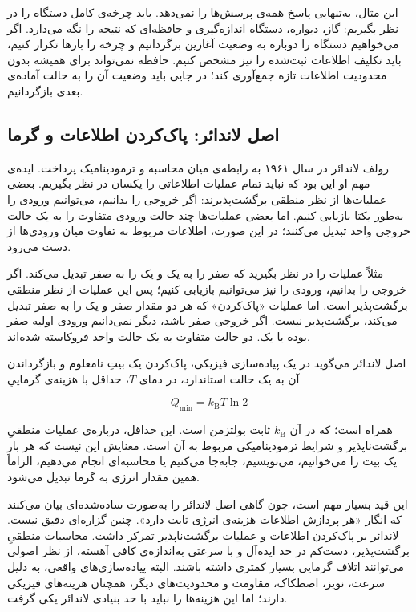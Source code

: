 این مثال، به‌تنهایی پاسخ همه‌ی پرسش‌ها را نمی‌دهد. باید چرخه‌ی کامل دستگاه را در نظر بگیریم: گاز، دیواره، دستگاه اندازه‌گیری و حافظه‌ای که نتیجه را نگه می‌دارد. اگر می‌خواهیم دستگاه را دوباره به وضعیت آغازین برگردانیم و چرخه را بارها تکرار کنیم، باید تکلیف اطلاعات ثبت‌شده را نیز مشخص کنیم. حافظه نمی‌تواند برای همیشه بدون محدودیت اطلاعات تازه جمع‌آوری کند؛ در جایی باید وضعیت آن را به حالت آماده‌ی بعدی بازگردانیم.

\subsection{اصل لاندائر: پاک‌کردن اطلاعات و گرما}
\label{sub:landauer-principle}

رولف لاندائر در سال ۱۹۶۱ به رابطه‌ی میان محاسبه و ترمودینامیک پرداخت. ایده‌ی مهم او این بود که نباید تمام عملیات اطلاعاتی را یکسان در نظر بگیریم. بعضی عملیات‌ها از نظر منطقی برگشت‌پذیرند: اگر خروجی را بدانیم، می‌توانیم ورودی را به‌طور یکتا بازیابی کنیم. اما بعضی عملیات‌ها چند حالت ورودی متفاوت را به یک حالت خروجی واحد تبدیل می‌کنند؛ در این صورت، اطلاعات مربوط به تفاوت میان ورودی‌ها از دست می‌رود.

مثلاً عملیات  را در نظر بگیرید که صفر را به یک و یک را به صفر تبدیل می‌کند. اگر خروجی را بدانیم، ورودی را نیز می‌توانیم بازیابی کنیم؛ پس این عملیات از نظر منطقی برگشت‌پذیر است. اما عملیات «پاک‌کردن» که هر دو مقدار صفر و یک را به صفر تبدیل می‌کند، برگشت‌پذیر نیست. اگر خروجی صفر باشد، دیگر نمی‌دانیم ورودی اولیه صفر بوده یا یک. دو حالت متفاوت به یک حالت واحد فروکاسته شده‌اند.

اصل لاندائر می‌گوید در یک پیاده‌سازی فیزیکی، پاک‌کردن یک بیتِ نامعلوم و بازگرداندن آن به یک حالت استاندارد، در دمای \(T\)، حداقل با هزینه‌ی گرماییِ

\[
Q_{\min}=k_{\mathrm B}T\ln 2
\]

همراه است؛ که در آن \(k_{\mathrm B}\) ثابت بولتزمن است. این حداقل، درباره‌ی عملیات منطقیِ برگشت‌ناپذیر و شرایط ترمودینامیکی مربوط به آن است. معنایش این نیست که هر بار یک بیت را می‌خوانیم، می‌نویسیم، جابه‌جا می‌کنیم یا محاسبه‌ای انجام می‌دهیم، الزاماً همین مقدار انرژی به گرما تبدیل می‌شود. \autocite{landauer1961,bennett1982,sep-information-entropy}

این قید بسیار مهم است، چون گاهی اصل لاندائر را به‌صورت ساده‌شده‌ای بیان می‌کنند که انگار «هر پردازش اطلاعات هزینه‌ی انرژی ثابت دارد». چنین گزاره‌ای دقیق نیست. لاندائر بر پاک‌کردن اطلاعات و عملیات برگشت‌ناپذیر تمرکز داشت. محاسبات منطقیِ برگشت‌پذیر، دست‌کم در حد ایده‌آل و با سرعتی به‌اندازه‌ی کافی آهسته، از نظر اصولی می‌توانند اتلاف گرمایی بسیار کمتری داشته باشند. البته پیاده‌سازی‌های واقعی، به دلیل سرعت، نویز، اصطکاک، مقاومت و محدودیت‌های دیگر، همچنان هزینه‌های فیزیکی دارند؛ اما این هزینه‌ها را نباید با حد بنیادی لاندائر یکی گرفت. \autocite{bennett1982,sep-information-entropy}

